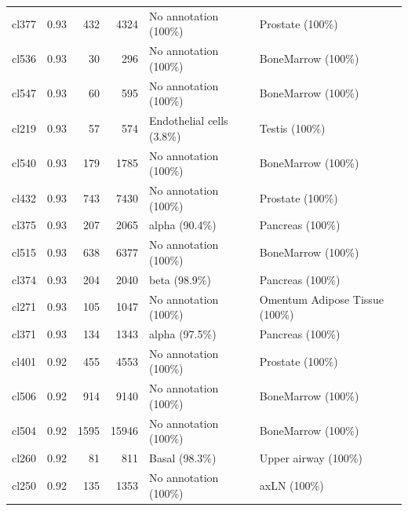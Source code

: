 \begin{table}[ht!]
\begin{tabular}{lrrrll}
  cl377 & 0.93 & 432 & 4324 & No annotation (100\%) & Prostate (100\%) \\ 
  cl536 & 0.93 &  30 & 296 & No annotation (100\%) & BoneMarrow (100\%) \\ 
  cl547 & 0.93 &  60 & 595 & No annotation (100\%) & BoneMarrow (100\%) \\ 
  cl219 & 0.93 &  57 & 574 & Endothelial cells (3.8\%) & Testis (100\%) \\ 
  cl540 & 0.93 & 179 & 1785 & No annotation (100\%) & BoneMarrow (100\%) \\ 
  cl432 & 0.93 & 743 & 7430 & No annotation (100\%) & Prostate (100\%) \\ 
  cl375 & 0.93 & 207 & 2065 & alpha (90.4\%) & Pancreas (100\%) \\ 
  cl515 & 0.93 & 638 & 6377 & No annotation (100\%) & BoneMarrow (100\%) \\ 
  cl374 & 0.93 & 204 & 2040 & beta (98.9\%) & Pancreas (100\%) \\ 
  cl271 & 0.93 & 105 & 1047 & No annotation (100\%) & Omentum Adipose Tissue (100\%) \\ 
  cl371 & 0.93 & 134 & 1343 & alpha (97.5\%) & Pancreas (100\%) \\ 
  cl401 & 0.92 & 455 & 4553 & No annotation (100\%) & Prostate (100\%) \\ 
  cl506 & 0.92 & 914 & 9140 & No annotation (100\%) & BoneMarrow (100\%) \\ 
  cl504 & 0.92 & 1595 & 15946 & No annotation (100\%) & BoneMarrow (100\%) \\ 
  cl260 & 0.92 &  81 & 811 & Basal (98.3\%) & Upper airway (100\%) \\ 
  cl250 & 0.92 & 135 & 1353 & No annotation (100\%) & axLN (100\%) \\ 
   \bottomrule
\end{tabular}
\end{table}  
  
